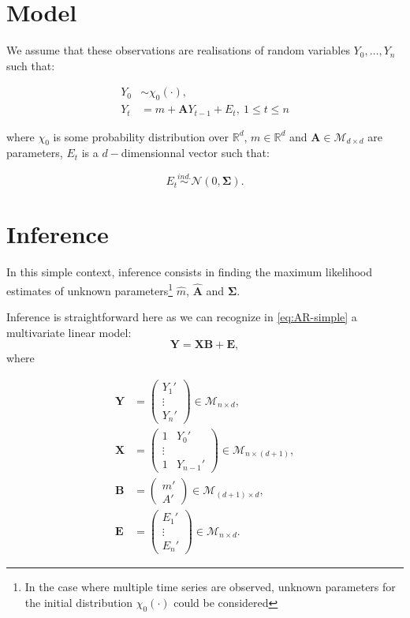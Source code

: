 \documentclass[]{book}
\begin{document}
\section{Model}\label{model}

We assume that these observations are realisations of random variables
\(Y_0,\dots, Y_n\) such that:

\begin{align}
Y_0 &\sim \chi_0(\cdot),\nonumber \\
Y_t &= m + \mathbf{A}Y_{t -1} + E_t,~1\leq t \leq n \label{eq:AR-simple}
\end{align}

where \(\chi_0\) is some probability distribution over \(\mathbb{R}^d\),
\(m\in\mathbb{R}^d\) and \(\mathbf{A}\in \mathcal{M}_{d\times d}\) are
parameters, \(E_t\) is a \(d-\)dimensionnal vector such that:

\begin{equation*}
E_t \overset{ind.}{\sim} \mathcal{N}\left(0, \mathbf{\Sigma}\right).
\end{equation*}

\section{Inference}\label{inference}

In this simple context, inference consists in finding the maximum
likelihood estimates of unknown
parameters\footnote{In the case where multiple time series are observed, unknown parameters for the initial distribution $\chi_0(\cdot)$ could be considered}
\(\hat{m}\), \(\hat{\mathbf{A}}\) and \(\mathbf{\Sigma}\).

Inference is straightforward here as we can recognize in
\eqref{eq:AR-simple} a multivariate linear model:
\[\mathbf{Y} = \mathbf{XB} + \mathbf{E},\] where

\begin{align*}
\mathbf{Y} &= 
\begin{pmatrix}
Y_1'\\
\vdots\\
Y_n'
\end{pmatrix} \in \mathcal{M}_{n \times d},\\
\mathbf{X} &= 
\begin{pmatrix}
1 & Y_0'\\
\vdots\\
1 & Y_{n-1}'
\end{pmatrix} \in \mathcal{M}_{n \times (d+1)},\\
\mathbf{B} &= 
\begin{pmatrix}
m'\\
A'
\end{pmatrix} \in \mathcal{M}_{(d + 1) \times d},\\
\mathbf{E} &= 
\begin{pmatrix}
E_1'\\
\vdots\\
E_n'
\end{pmatrix} \in \mathcal{M}_{n \times d}.
\end{align*}
\end{document}
